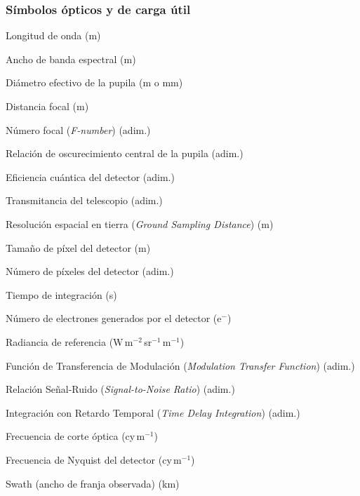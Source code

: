 \subsubsection*{Símbolos ópticos y de carga útil}
\begin{description}[leftmargin=4.5cm, labelwidth=4cm, labelsep=0.5cm]
  \item[$\lambda$]          Longitud de onda (m)
  \item[$\Delta\lambda$]    Ancho de banda espectral (m)
  \item[$D$]                Diámetro efectivo de la pupila (m o mm)
  \item[$f$]                Distancia focal (m)
  \item[$f/D$]              Número focal (\textit{F-number}) (adim.)
  \item[$R$]                Relación de oscurecimiento central de la pupila (adim.)
  \item[$\eta$]             Eficiencia cuántica del detector (adim.)
  \item[$\tau$]             Transmitancia del telescopio (adim.)
  \item[GSD]                Resolución espacial en tierra (\textit{Ground Sampling Distance}) (m)
  \item[$p$]                Tamaño de píxel del detector (m)
  \item[$N_\text{pix}$]     Número de píxeles del detector (adim.)
  \item[$t_\text{int}$]     Tiempo de integración (s)
  \item[$N_e$]              Número de electrones generados por el detector (e$^-$)
  \item[$L_\text{ref}$]     Radiancia de referencia (W\,m$^{-2}$\,sr$^{-1}$\,\textmu m$^{-1}$)
  \item[MTF]                Función de Transferencia de Modulación (\textit{Modulation Transfer Function}) (adim.)
  \item[SNR]                Relación Señal-Ruido (\textit{Signal-to-Noise Ratio}) (adim.)
  \item[TDI]                Integración con Retardo Temporal (\textit{Time Delay Integration}) (adim.)
  \item[$f_\text{co}$]      Frecuencia de corte óptica (cy\,m$^{-1}$)
  \item[$f_\text{Nyq}$]     Frecuencia de Nyquist del detector (cy\,m$^{-1}$)
  \item[SW]                 Swath (ancho de franja observada) (km)
\end{description}

